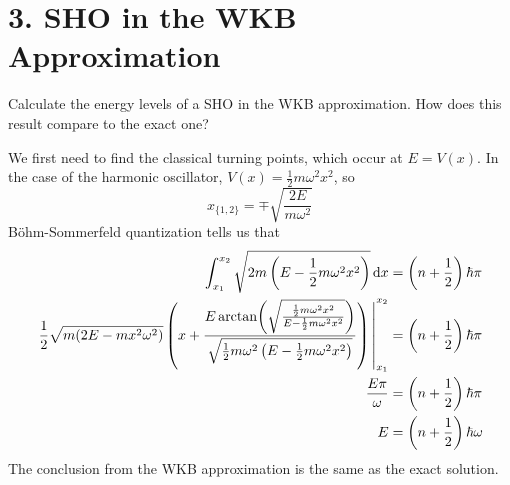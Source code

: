 \documentclass[a4paper,twoside]{article}
\begin{document}
\section*{3. SHO in the WKB Approximation}
Calculate the energy levels of a SHO in the WKB approximation. How does this result compare to the exact one?
\begin{problem}
    We first need to find the classical turning points, which occur at $ E = V(x) $. In the case of the harmonic oscillator, $ V(x) = \frac{1}{2} m \omega^2 x^2 $, so
    \begin{equation}
        x_{\{1,2\}} = \mp \sqrt{\frac{2E}{m \omega^2}}
    \end{equation}
    B\"ohm-Sommerfeld quantization tells us that
    \begin{align}
        \int_{x_1}^{x_2} \sqrt{2m\left( E - \frac{1}{2} m \omega^2 x^2 \right)} \dd{x} &= \left( n + \frac{1}{2}\right) \hbar \pi \\
        \eval{\frac{1}{2} \sqrt{m(2E - m x^2 \omega^2)} \left( x + \frac{E\arctan(\sqrt{\frac{\frac{1}{2} m \omega^2 x^2}{E - \frac{1}{2}m \omega^2 x^2}})}{\sqrt{\frac{1}{2} m \omega^2 \left( E - \frac{1}{2} m \omega^2 x^2 \right)}} \right)}_{x_1}^{x_2} &= \left( n + \frac{1}{2} \right) \hbar \pi\\
        \frac{E \pi}{\omega} &= \left( n + \frac{1}{2} \right) \hbar \pi \\
        E &= \left( n + \frac{1}{2} \right) \hbar \omega
    \end{align}
    The conclusion from the WKB approximation is the same as the exact solution.
\end{problem}
\end{document}
